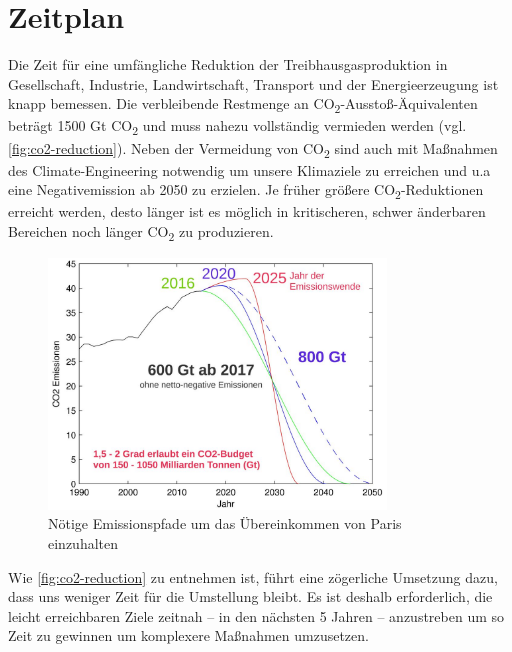 \section{Zeitplan}

Die Zeit für eine umfängliche Reduktion der Treibhausgasproduktion in Gesellschaft, Industrie, Landwirtschaft, Transport und der Energieerzeugung ist knapp bemessen.
Die verbleibende Restmenge an CO\textsubscript{2}-Ausstoß-Äquivalenten beträgt 1500 Gt CO\textsubscript{2} und muss nahezu vollständig vermieden werden (vgl. \autoref{fig:co2-reduction}).
Neben der Vermeidung von CO\textsubscript{2} sind auch mit Maßnahmen des Climate-Engineering notwendig um unsere Klimaziele zu erreichen und u.a eine Negativemission ab 2050 zu erzielen.
Je früher größere CO\textsubscript{2}-Reduktionen erreicht werden, desto länger ist es möglich in kritischeren, schwer änderbaren Bereichen noch länger CO\textsubscript{2} zu produzieren.

\begin{figure}[!htb]
	\centering
	\includegraphics[width=0.8\textwidth]{emission-paths-for-reaching-the-paris-agreement.jpg}
	\caption{Nötige Emissionspfade um das Übereinkommen von Paris einzuhalten}
	\label{fig:co2-reduction}
\end{figure}

Wie \autoref{fig:co2-reduction} zu entnehmen ist, führt eine zögerliche Umsetzung dazu, dass uns weniger Zeit für die Umstellung bleibt.
Es ist deshalb erforderlich, die leicht erreichbaren Ziele zeitnah -- in den nächsten 5 Jahren -- anzustreben um so Zeit zu gewinnen um komplexere Maßnahmen umzusetzen.






